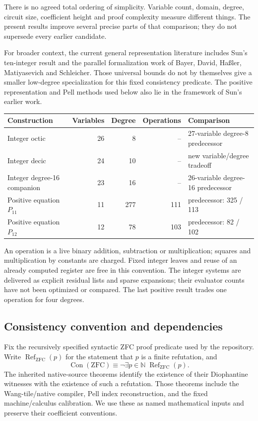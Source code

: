 \documentclass[11pt,letterpaper]{article}
\newcommand{\N}{\mathbb N}
\newcommand{\Con}{\operatorname{Con}}
\newcommand{\ZFC}{\mathrm{ZFC}}
\theoremstyle{definition}
\theoremstyle{remark}
\begin{document}
There is no agreed total ordering of simplicity. Variable count, domain,
degree, circuit size, coefficient height and proof complexity measure
different things. The present results improve several precise parts of
that comparison; they do not supersede every earlier candidate.

For broader context, the current general representation literature includes
Sun's ten-integer result and the parallel formalization work of Bayer,
David, Ha\ss ler, Matiyasevich and Schleicher\cite{sun2026,bayer2026}.
Those universal bounds do not by themselves give a smaller low-degree
specialization for this fixed consistency predicate. The positive
representation and Pell methods used below also lie in the framework
of Sun's earlier work\cite{sun2021}.

\begin{center}
\small
\begin{tabular}{@{}lrrrl@{}}
\toprule
Construction & Variables & Degree & Operations & Comparison\\
\midrule
Integer octic & 26 & 8 & -- & 27-variable degree-8 predecessor\\
Integer decic & 24 & 10 & -- & new variable/degree tradeoff\\
Integer degree-16 companion & 23 & 16 & -- & 26-variable degree-16 predecessor\\
Positive equation $P_{11}$ & 11 & 277 & 111 & predecessor: 325 / 113\\
Positive equation $P_{12}$ & 12 & 78 & 103 & predecessor: 82 / 102\\
\bottomrule
\end{tabular}
\end{center}

An operation is a live binary addition, subtraction or multiplication;
squares and multiplication by constants are charged. Fixed integer leaves
and reuse of an already computed register are free in this convention.
The integer systems are delivered as explicit residual lists and sparse
expansions; their evaluator counts have not been optimized or compared.
The last positive result trades one operation for four degrees.

\subsection{Consistency convention and dependencies}

Fix the recursively specified syntactic ZFC proof predicate used by the
repository. Write $\operatorname{Ref}_{\ZFC}(p)$ for the statement that $p$
is a finite refutation, and
\[
 \Con(\ZFC)\equiv\neg\exists p\in\N\;\operatorname{Ref}_{\ZFC}(p).
\]
The inherited native-source theorems identify the existence of their
Diophantine witnesses with the existence of such a refutation. Those
theorems include the Wang-tile/native compiler, Pell index reconstruction,
and the fixed machine/calculus calibration. We use these as named
mathematical inputs and preserve their coefficient conventions.
\end{document}
